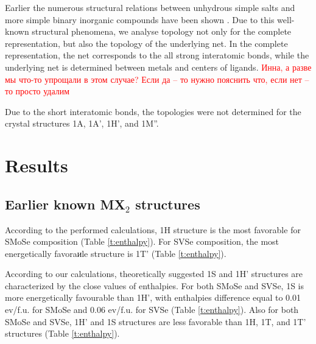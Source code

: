 \documentclass[a4paperm]{article}
\begin{document}
Earlier the numerous structural relations between unhydrous simple salts and more simple binary inorganic compounds have been shown \cite{blatov2011_salts, medrish2020_zintl}. 
Due to this well-known structural phenomena, we analyse topology not only for the complete  representation, but also the topology of the underlying net.
In the complete representation, the net corresponds to the all strong interatomic bonds, while the underlying net is determined between metals and centers of ligands.
\textcolor{red}{Инна, а разве мы что-то упрощали в этом случае? Если да -- то нужно пояснить что, если нет -- то просто удалим}

Due to the short interatomic bonds, the topologies were not determined for the crystal structures 1A, 1A', 1H', and  1M''.


			\section{Results}

\subsection*{Earlier known MX$_2$ structures}

According to the performed calculations, 1H structure is the most favorable for SMoSe composition  (Table \ref{t:enthalpy}).
For SVSe composition, the most energetically favoraиle structure is 1T' (Table \ref{t:enthalpy}). 

According to our calculations, theoretically suggested 1S and 1H' \cite{tang2021_janus,ma2016_fxt} structures are characterized by the close values of enthalpies.
For both SMoSe and SVSe, 1S is more energetically favourable than 1H', with enthalpies difference equal to 0.01 ev/f.u. for SMoSe and 0.06 ev/f.u. for SVSe (Table \ref{t:enthalpy}).
Also for both SMoSe and SVSe, 1H' and 1S structures are less favorable than 1H, 1T, and 1T' structures (Table \ref{t:enthalpy}).
\end{document}
